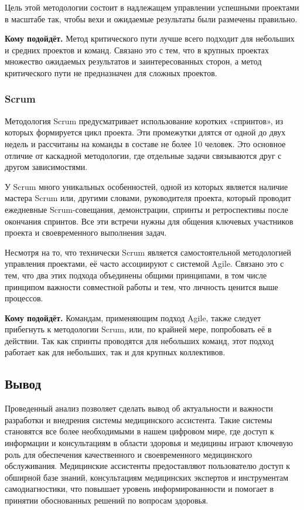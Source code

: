 Цель этой методологии состоит в надлежащем управлении успешными проектами в масштабе так, чтобы вехи и ожидаемые результаты были размечены правильно.

\textbf{Кому подойдёт.} Метод критического пути лучше всего подходит для небольших и средних проектов и команд. Связано это с тем, что в крупных проектах множество ожидаемых результатов и заинтересованных сторон, а метод критического пути не предназначен для сложных проектов. 

\subsubsection{Scrum} 

 Методология Scrum предусматривает использование коротких «спринтов», из которых формируется цикл проекта. Эти промежутки длятся от одной до двух недель и рассчитаны на команды в составе не более 10 человек. Это основное отличие от каскадной методологии, где отдельные задачи связываются друг с другом зависимостями.

У Scrum много уникальных особенностей, одной из которых является наличие мастера Scrum или, другими словами, руководителя проекта, который проводит ежедневные Scrum-совещания, демонстрации, спринты и ретроспективы после окончания спринтов. Все эти встречи нужны для общения ключевых участников проекта и своевременного выполнения задач.

Несмотря на то, что технически Scrum является самостоятельной методологией управления проектами, её часто ассоциируют с системой Agile. Связано это с тем, что два этих подхода объединены общими принципами, в том числе принципом важности совместной работы и тем, что личность ценится выше процессов.

\textbf{Кому подойдёт.} Командам, применяющим подход Agile, также следует прибегнуть к методологии Scrum, или, по крайней мере, попробовать её в действии. Так как спринты проводятся для небольших команд, этот подход работает как для небольших, так и для крупных коллективов. 

\subsection{Вывод}

Проведенный анализ позволяет сделать вывод об актуальности и важности разработки и внедрения системы медицинского ассистента. Такие системы становятся все более необходимыми в нашем цифровом мире, где доступ к информации и консультациям в области здоровья и медицины играют ключевую роль для обеспечения качественного и своевременного медицинского обслуживания. Медицинские ассистенты предоставляют пользователю доступ к обширной базе знаний, консультациям медицинских экспертов и инструментам самодиагностики, что повышает уровень информированности и помогает в принятии обоснованных решений по вопросам здоровья.

